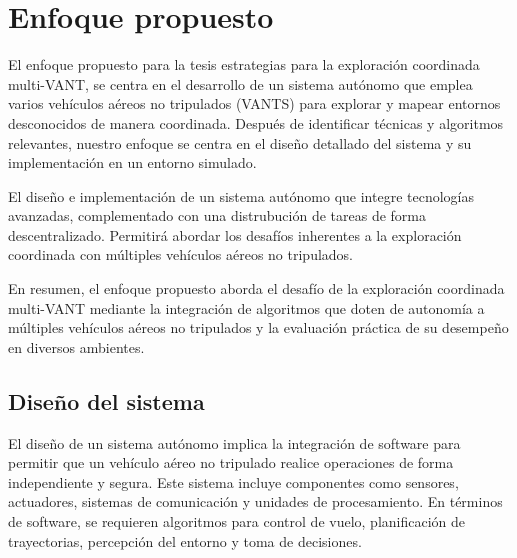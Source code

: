 \chapter{Enfoque propuesto}

El enfoque propuesto para la tesis estrategias para la exploración coordinada multi-VANT, se centra en el desarrollo de un sistema autónomo que emplea varios vehículos aéreos no tripulados (VANTS) para explorar y mapear entornos desconocidos de manera coordinada. Después de identificar técnicas y algoritmos relevantes, nuestro enfoque se centra en el diseño detallado del sistema y su implementación en un entorno simulado.

El diseño e implementación de un sistema autónomo que integre tecnologías avanzadas, complementado con una distrubución de tareas de forma descentralizado. Permitirá abordar los desafíos inherentes a la exploración coordinada con múltiples vehículos aéreos no tripulados.

En resumen, el enfoque propuesto aborda el desafío de la exploración coordinada multi-VANT mediante la integración de algoritmos que doten de autonomía a múltiples vehículos aéreos no tripulados y la evaluación práctica de su desempeño en diversos ambientes.





\section{Diseño del sistema}

El diseño de un sistema autónomo implica la integración de software para permitir que un vehículo aéreo no tripulado realice operaciones de forma independiente y segura. Este sistema incluye componentes como sensores, actuadores, sistemas de comunicación y unidades de procesamiento. En términos de software, se requieren algoritmos para control de vuelo, planificación de trayectorias, percepción del entorno y toma de decisiones.

